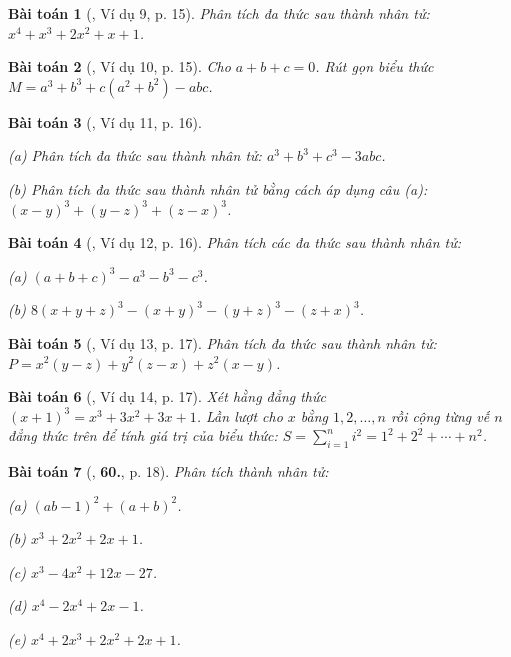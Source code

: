 \documentclass{article}
\numberwithin{equation}{section}
\newtheorem{baitoan}{Bài toán}[section]
\begin{document}
\begin{baitoan}[\cite{Binh_Toan_8_tap_1}, Ví dụ 9, p. 15]
	Phân tích đa thức sau thành nhân tử: 	$x^4 + x^3 + 2x^2 + x + 1$.
\end{baitoan}

\begin{baitoan}[\cite{Binh_Toan_8_tap_1}, Ví dụ 10, p. 15]
	Cho $a + b + c = 0$. Rút gọn biểu thức $M = a^3 + b^3 + c(a^2 + b^2) - abc$.
\end{baitoan}

\begin{baitoan}[\cite{Binh_Toan_8_tap_1}, Ví dụ 11, p. 16]
	\begin{enumerate*}
		\item[(a)] Phân tích đa thức sau thành nhân tử: $a^3 + b^3 + c^3 - 3abc$.
		\item[(b)] Phân tích đa thức sau thành nhân tử bằng cách áp dụng câu (a): $(x - y)^3 + (y - z)^3 + (z - x)^3$.
	\end{enumerate*}
\end{baitoan}

\begin{baitoan}[\cite{Binh_Toan_8_tap_1}, Ví dụ 12, p. 16]
	Phân tích các đa thức sau thành nhân tử:
	\begin{enumerate*}
		\item[(a)] $(a + b + c)^3 - a^3 - b^3 - c^3$.
		\item[(b)] $8(x + y + z)^3 - (x + y)^3 - (y + z)^3 - (z + x)^3$.
	\end{enumerate*}
\end{baitoan}

\begin{baitoan}[\cite{Binh_Toan_8_tap_1}, Ví dụ 13, p. 17]
	Phân tích đa thức sau thành nhân tử: $P = x^2(y - z) + y^2(z - x) + z^2(x -y)$.
\end{baitoan}

\begin{baitoan}[\cite{Binh_Toan_8_tap_1}, Ví dụ 14, p. 17]
	Xét hằng đẳng thức $(x + 1)^3 = x^3 + 3x^2 + 3x + 1$. Lần lượt cho $x$ bằng $1,2,\ldots,n$ rồi cộng từng vế $n$ đẳng thức trên để tính giá trị của biểu thức: $S = \sum_{i=1}^n i^2 = 1^2 + 2^2 + \cdots + n^2$.
\end{baitoan}

\begin{baitoan}[\cite{Binh_Toan_8_tap_1}, \textbf{60.}, p. 18]
	Phân tích thành nhân tử:
	\begin{enumerate*}
		\item[(a)] $(ab - 1)^2 + (a + b)^2$.
		\item[(b)] $x^3 + 2x^2 + 2x + 1$.
		\item[(c)] $x^3 - 4x^2 + 12x - 27$.
		\item[(d)] $x^4 - 2x^4 + 2x - 1$.
		\item[(e)] $x^4 + 2x^3 + 2x^2 + 2x + 1$.
	\end{enumerate*}
\end{baitoan}
\end{document}
